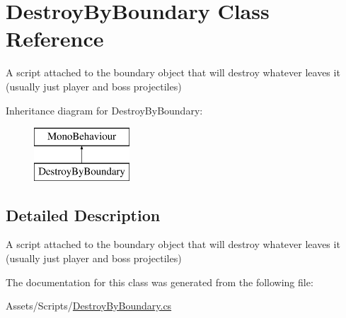 \hypertarget{class_destroy_by_boundary}{}\section{Destroy\+By\+Boundary Class Reference}
\label{class_destroy_by_boundary}


A script attached to the boundary object that will destroy whatever leaves it (usually just player and boss projectiles)  


Inheritance diagram for Destroy\+By\+Boundary\+:\begin{figure}[H]
\begin{center}
\leavevmode
\includegraphics[height=2.000000cm]{class_destroy_by_boundary}
\end{center}
\end{figure}


\subsection{Detailed Description}
A script attached to the boundary object that will destroy whatever leaves it (usually just player and boss projectiles) 

The documentation for this class was generated from the following file\+:\begin{DoxyCompactItemize}
\item 
Assets/\+Scripts/\mbox{\hyperlink{_destroy_by_boundary_8cs}{Destroy\+By\+Boundary.\+cs}}\end{DoxyCompactItemize}
